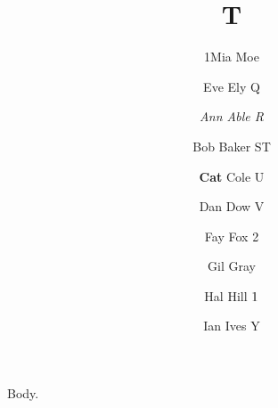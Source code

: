\documentclass{article}
\newcommand\twiceq{\def\y{1}\def\y{2}}
\begin{document}
\title{T}
\author{\expandafter\def\csname ww\endcsname{1}Mia Moe
\and \long\global{}Eve Ely \q
\and \itshape\global\def\r{R}Ann Able \r
\and \def\s{S}\global\def\t{T}Bob Baker \s\t
\and \def\u{U}\textbf{Cat} Cole \u
\and \iftrue\def\v{V}\fi Dan Dow \v
\and \twiceq Fay Fox \y
\and Gil Gray 
\and Hal Hill $\long\def\zz{1}\zz$
\and Ian Ives \mbox{\expandafter\def\csname zy\endcsname{Y}\zy}}
\maketitle
Body.
\end{document}
